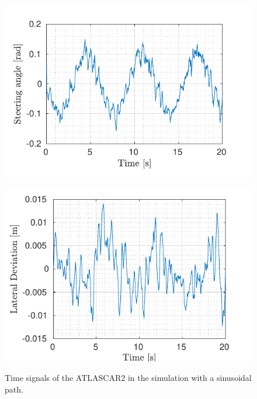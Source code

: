 \begin{figure}[!t]
\begin{minipage}[t]{0.49\textwidth}
		\includegraphics[width=\textwidth]{../../MATLAB/lane_following/figure/SteeringAngleVsTime.pdf}
		\label{fig:steering_laneFollowing}
	\end{minipage}
	\begin{minipage}[t]{0.49\textwidth}
		\includegraphics[width=\textwidth]{../../MATLAB/lane_following/figure/LateralDeviationVsTime.pdf}
		\label{fig:lateral_deviation_laneFollowing}
	\end{minipage}
	\caption{Time signals of the ATLASCAR2 in the simulation with a sinusoidal path.}
	\label{fig:laneFollowing_signals}
\end{figure}

